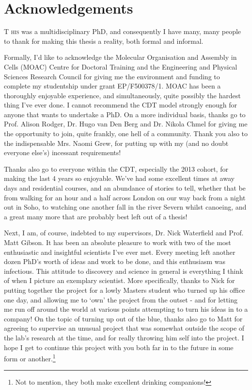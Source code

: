 \rhead{\textsf{}}
\chapter*{Acknowledgements}

\lettrine[lraise=0.0, nindent=0.1em, slope=1em]{T}{ his} was a multidisciplinary PhD, and consequently I have many, many people to thank for making this thesis a reality, both formal and informal.

Formally, I'd like to acknowledge the Molecular Organisation and Assembly in Cells (MOAC) Centre for Doctoral Training and the Engineering and Physical Sciences Research Council for giving me the environment and funding to complete my studentship under grant EP/F500378/1. MOAC has been a thoroughly enjoyable experience, and simultaneously, quite possibly the hardest thing I've ever done. I cannot recommend the CDT model strongly enough for anyone that wants to undertake a PhD. On a more individual basis, thanks go to Prof. Alison Rodger, Dr. Hugo van Den Berg and Dr. Nikola Chmel for giving me the opportunity to join, quite frankly, one hell of a community. Thank you also to the indispensable Mrs. Naomi Grew, for putting up with my (and no doubt everyone else's) incessant requirements!

Thanks also go to everyone within the CDT, especially the 2013 cohort, for making the last 4 years so enjoyable. We've had some excellent times at away days and residential courses, and an abundance of stories to tell, whether that be from walking for an hour and a half across London on our way back from a night out in Soho, to watching one another fall in the river Severn whilst canoeing, and a great many more that are probably best left out of a thesis!

Next, I am, of course, indebted to my supervisors, Dr. Nick Waterfield and Prof. Matt Gibson. It has been an absolute pleasure to work with two of the most enthusiastic and insightful scientists I've ever met. Every meeting left another dozen PhD's worth of ideas and work to be done, and this enthusiasm was infectious. This attitude to discovery and science in general is everything I think of when I picture an exemplary scientist. More specifically, thanks to Nick for putting together the project for a lowly Masters student who turned up his office one day, and allowing me to `own' the project from the outset - and for letting me run off around the world at various points attempting to turn his ideas in to a company! On the topic of turning up out of the blue, thanks also go to Matt for agreeing to supervise an unusual project that was somewhat outside the scope of the lab's research at the time, and for really throwing him self into the project. I hope I get to continue this project with you both far in to the future in some form or another.\footnote{Not to mention, they both make excellent drinking companions!}

